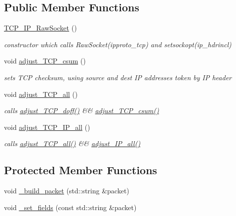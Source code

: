 \subsection*{Public Member Functions}
\begin{CompactItemize}
\item 
\hyperlink{classsocketpp_1_1TCP__IP__RawSocket_1b08f12274fd9590f805bc876c44edd9}{TCP\_\-IP\_\-RawSocket} ()
\begin{CompactList}\small\item\em constructor which calls RawSocket(ipproto\_\-tcp) and setsockopt(ip\_\-hdrincl) \item\end{CompactList}\item 
void \hyperlink{classsocketpp_1_1TCP__IP__RawSocket_c203b188308532333bdf53a4e18bc230}{adjust\_\-TCP\_\-csum} ()
\begin{CompactList}\small\item\em sets TCP checksum, using source and dest IP addresses token by IP header \item\end{CompactList}\item 
void \hyperlink{classsocketpp_1_1TCP__IP__RawSocket_3644327ff72d322ff809ac432f59783b}{adjust\_\-TCP\_\-all} ()
\begin{CompactList}\small\item\em calls \hyperlink{classsocketpp_1_1TCP__RawSocket_029eb8bfbf19531253edf046775d9f5f}{adjust\_\-TCP\_\-doff()} \&\& \hyperlink{classsocketpp_1_1TCP__IP__RawSocket_c203b188308532333bdf53a4e18bc230}{adjust\_\-TCP\_\-csum()} \item\end{CompactList}\item 
void \hyperlink{classsocketpp_1_1TCP__IP__RawSocket_dd3b21314f1768962bf399291f406768}{adjust\_\-TCP\_\-IP\_\-all} ()
\begin{CompactList}\small\item\em calls \hyperlink{classsocketpp_1_1TCP__IP__RawSocket_3644327ff72d322ff809ac432f59783b}{adjust\_\-TCP\_\-all()} \&\& \hyperlink{classsocketpp_1_1IP__RawSocket_45e60510233daaa2f279d3a4706fdce5}{adjust\_\-IP\_\-all()} \item\end{CompactList}\end{CompactItemize}
\subsection*{Protected Member Functions}
\begin{CompactItemize}
\item 
void \hyperlink{classsocketpp_1_1TCP__IP__RawSocket_281508237add8a3c530bb0be0b6a1e7b}{\_\-build\_\-packet} (std::string \&packet)
\item 
void \hyperlink{classsocketpp_1_1TCP__IP__RawSocket_f8f606ce33835813cc5c3a530e181432}{\_\-set\_\-fields} (const std::string \&packet)
\end{CompactItemize}



